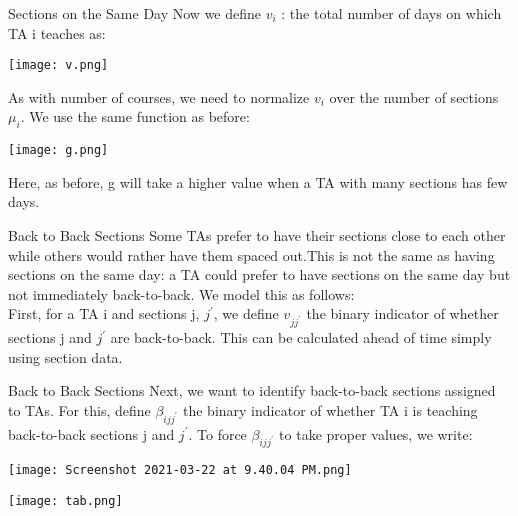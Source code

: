 \documentclass[9pt]{beamer}
\begin{document}
\begin{frame}{Sections on the Same Day}
Now we define $ v_i $ : the total number of days on which TA i teaches as:\\
\begin{center}
    \texttt{[image: v.png]}
\end{center}
\pause
As with number of courses, we need to normalize $ v_i $ over the number of sections $ \mu_i $. We use the same function as before:\\
\begin{center}
    \texttt{[image: g.png]}
\end{center}
Here, as before, g will take a higher value when a TA with many sections has few days.
\end{frame} 

\begin{frame}{Back to Back Sections}
Some TAs prefer to have their sections close to each other while others would rather have them spaced out.This is not the same as having sections on the same day: a TA could prefer to have sections on the same day but not immediately back-to-back. We model this as follows:\\
\vspace{0.3cm}
\pause
First, for a TA i and sections j, $ j^{'} $, we define $ v_{jj^'} $ the binary indicator of whether sections j and $ j^{'} $ are back-to-back. This can be calculated ahead of time simply using section data.\\
\end{frame}

\begin{frame}{Back to Back Sections}
Next, we want to identify back-to-back sections assigned to TAs. For this, define $ \beta_{ijj^'} $ the binary indicator of whether TA i is teaching back-to-back sections j and $ j^{'} $. To force $ \beta_{ijj^'} $ to take proper values, we write:
\pause
\begin{center}
    \texttt{[image: Screenshot 2021-03-22 at 9.40.04 PM.png]}
\end{center}
\vspace{0.1cm}
\pause
\begin{center}
    \texttt{[image: tab.png]}\\
\end{center}
\end{frame} 
\end{document}

